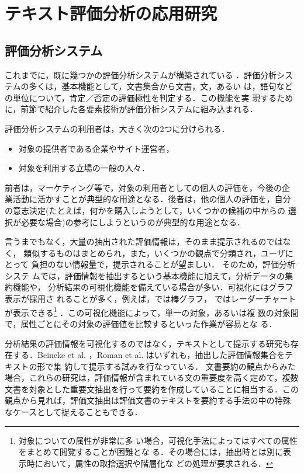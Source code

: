 \section{テキスト評価分析の応用研究}
\label{sec:appl}

\subsection{評価分析システム}

これまでに，既に幾つかの評価分析システムが構築されている
\cite{li2001a,morinaga2002a,dini2002a,dave2003a,sano2004a,sano2004b,tateishi2004a,blogwatcher,fujimura2004a,yi2005a,liu2005a} 
．評価分析システムの多くは，基本機能として，文書集合から文書，文，あるい
は，語句などの単位について，肯定／否定の評価極性を判定する．この機能を実
現するために，前節で紹介した各要素技術が評価分析システムに組み込まれる．

評価分析システムの利用者は，大きく次の2つに分けられる．
\begin{itemize}
\item 対象の提供者である企業やサイト運営者，
\item 対象を利用する立場の一般の人々．
\end{itemize}
前者は，マーケティング等で，対象の利用者としての個人の評価を，今後の企
業活動に活かすことが典型的な用途となる．後者は，他の個人の評価を，自分
の意志決定(たとえば，何かを購入しようとして，いくつかの候補の中からの
選択が必要な場合)の参考にしようというのが典型的な用途となる．

言うまでもなく，大量の抽出された評価情報は，そのまま提示されるのではなく，
類似するものはまとめられ，また，いくつかの観点で分類され，ユーザにとって
負担のない情報量で，提示されることが望ましい． そのため，評価分析システ
ムでは，評価情報を抽出するという基本機能に加えて，分析データの集約機能や，
分析結果の可視化機能を備えている場合が多い．可視化にはグラフ表示が採用さ
れることが多く，例えば，\cite{yi2005a}では棒グラフ，\cite{tateishi2004a}
ではレーダーチャートが表示できる\footnote{ 対象についての属性が非常に多
い場合，可視化手法によってはすべての属性をまとめて閲覧することが困難とな
る．その場合には，抽出時とは別に表示時において，属性の取捨選択や階層化な
どの処理が要求される．} ．この可視化機能によって，単一の対象，あるいは複
数の対象間で，属性ごとにその対象の評価値を比較するといった作業が容易とな
る．

分析結果の評価情報を可視化するのではなく，テキストとして提示する研究も存
在する．Beineke et al. \cite{beineke2004a}，Roman et
al. \cite{roman2004a}はいずれも，抽出した評価情報集合をテキストの形で集
約して提示する試みを行なっている． 文書要約\cite{oku2005a}の観点からみた
場合，これらの研究は，評価情報が含まれている文の重要度を高く定めて，複数
文書を対象とした重要文抽出を行って要約を作成していることに相当する．この
観点から見れば，評価文抽出は評価文書のテキストを要約する手法の中の特殊
なケースとして捉えることもできる．


